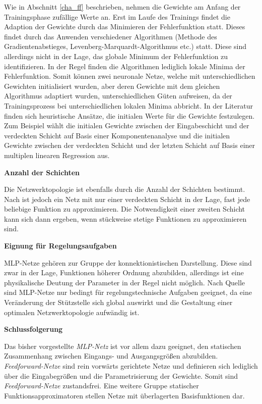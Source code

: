Wie in Abschnitt \ref{cha_ff} beschrieben, nehmen die Gewichte am Anfang der Trainingsphase zufällige Werte an. Erst im Laufe des Trainings findet die Adaption der Gewichte durch das Minimieren der Fehlerfunktion statt. Dieses findet durch das Anwenden verschiedener Algorithmen (Methode des Gradientenabstieges, Levenberg-Marquardt-Algorithmus etc.) statt. Diese sind allerdings nicht in der Lage, das globale Minimum der Fehlerfunktion zu identifizieren. In der Regel finden die Algorithmen lediglich lokale Minima der Fehlerfunktion. Somit können zwei neuronale Netze, welche mit unterschiedlichen Gewichten initialisiert wurden, aber deren Gewichte mit dem gleichen Algorithmus adaptiert wurden, unterschiedlichen Güten aufweisen, da der Trainingsprozess bei unterschiedlichen lokalen Minima abbricht. In der Literatur finden sich heuristische Ansätze, die initialen Werte für die Gewichte festzulegen. Zum Beispiel wählt \cite{Piovoso.1991b} die initialen Gewichte zwischen der Eingabeschicht und der verdeckten Schicht auf Basis einer Komponentenanalyse und die initialen Gewichte zwischen der verdeckten Schicht und der letzten Schicht auf Basis einer multiplen linearen Regression aus. 

\textbf{Anzahl der Schichten}

Die Netzwerktopologie ist ebenfalls durch die Anzahl der Schichten bestimmt. Nach \cite{Hornik.1989} ist jedoch ein Netz mit nur einer verdeckten Schicht in der Lage, fast jede beliebige Funktion zu approximieren. Die Notwendigkeit einer zweiten Schicht kann sich dann ergeben, wenn stückweise stetige Funktionen zu approximieren sind.


\textbf{Eignung für Regelungsaufgaben}

MLP-Netze gehören zur Gruppe der konnektionistischen Darstellung. Diese sind zwar in der Lage, Funktionen höherer Ordnung abzubilden, allerdings ist eine physikalische Deutung der Parameter in der Regel nicht möglich. Nach Quelle sind MLP-Netze nur bedingt für regelungstechnische Aufgaben geeignet, da eine Veränderung der Stützstelle sich global auswirkt und die Gestaltung einer optimalen Netzwerktopologie aufwändig ist.



\textbf{Schlussfolgerung}

Das bisher vorgestellte \textit{MLP-Netz} ist vor allem dazu geeignet, den statischen Zusammenhang zwischen Eingangs- und Ausgangsgrößen abzubilden. \textit{Feedforward-Netze} sind rein vorwärts gerichtete Netze und definieren sich lediglich über die Eingabegrößen und die Parametrisierung der Gewichte. Somit sind \textit{Feedforward-Netze} zustandsfrei. Eine weitere Gruppe statischer Funktionsapproximatoren stellen Netze mit überlagerten Basisfunktionen dar.



